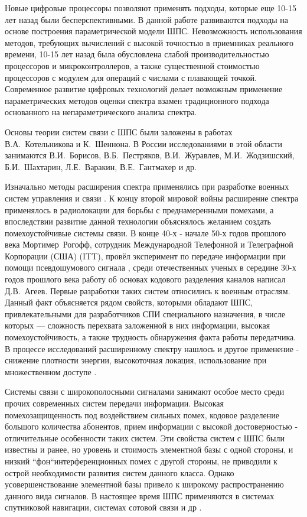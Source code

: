 Новые цифровые процессоры позволяют применять подходы, которые еще 10-15 лет назад были бесперспективными.
В данной работе развиваются подходы на основе построения параметрической модели ШПС. Невозможность использования
методов, требующих вычислений с высокой точностью в приемниках реального времени,
10-15 лет назад была обусловлена слабой производительностью процессоров и микроконтроллеров, а также существенной
стоимостью процессоров с модулем для операций с числами с плавающей точкой. Современное развитие цифровых технологий делает 
возможным применение параметрических методов оценки спектра взамен традиционного подхода основанного на непараметрического
анализа спектра.

Основы теории систем связи с ШПС были заложены в работах \mbox{В.А. Котельникова} и \mbox{К. Шеннона}.
В России исследованиями в этой области занимаются \mbox{В.И. Борисов}, \mbox{В.Б. Пестряков}, \mbox{В.И. Журавлев}, \mbox{М.И. Жодзишский},
\mbox{Б.И. Шахтарин}, \mbox{Л.Е.  Варакин}, \mbox{В.Е. Гантмахер} и др.

Изначально методы расширения спектра применялись при разработке военных систем управления и связи \cite{sklyar}.
К концу второй мировой войны расширение спектра применялось в радиолокации для борьбы с преднамеренными помехами, а
впоследствии развитие данной технологии объяснялось желанием создать помехоустойчивые системы связи.
В конце 40-х - начале 50-х годов прошлого века \mbox{Мортимер Рогофф}, сотрудник Международной Телефонной и Телеграфной Корпорации (США) (ITT),
провёл эксперимент по передаче информации при помощи псевдошумового сигнала \cite{sklyar}, среди отечественных ученых
в середине 30-х годов прошлого века работу об основах кодового разделения каналов написал \mbox{Д.В. Агеев.}
Первые разработки таких систем относились к военным отраслям. Данный факт объясняется рядом свойств, которыми обладают
ШПС, привлекательными для разработчиков СПИ специального назначения, в числе которых — сложность перехвата заложенной в них информации,
высокая помехоустойчивость, а также трудность обнаружения факта работы передатчика. В процессе исследований расширенному спектру
нашлось и другое применение - снижение плотности энергии, высокоточная локация, использование при множественном доступе
\cite{sklyar}.

Системы связи с широкополосными сигналами занимают особое место среди прочих современных систем передачи информации.
Высокая помехозащищенность под воздействием сильных помех, кодовое разделение большого количества абонентов, прием
информации с высокой достоверностью - отличительные особенности таких систем. Эти свойства систем с ШПС были известны и ранее, но
уровень и стоимость элементной базы с одной стороны, и низкий \textquotedblleft{фон}\textquotedblleft интерференционных помех с другой стороны, не приводили к острой необходимости развития систем данного класса.
Однако усовершенствование элементной базы привело к широкому распространению данного вида сигналов. В настоящее время ШПС применяются в системах спутниковой навигации,
системах сотовой связи и др \cite{varakin-book}.

